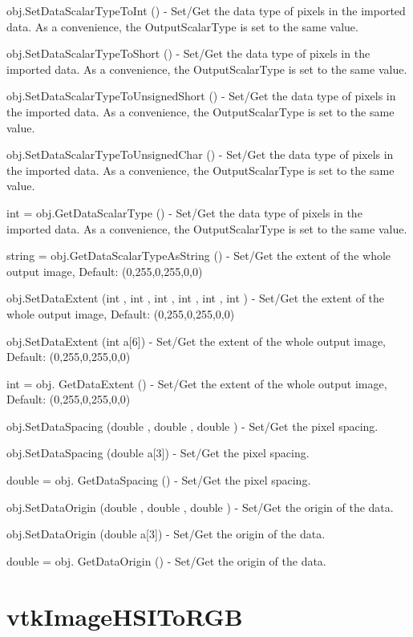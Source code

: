 \begin{DoxyItemize}
\item {\ttfamily obj.\-Set\-Data\-Scalar\-Type\-To\-Int ()} -\/ Set/\-Get the data type of pixels in the imported data. As a convenience, the Output\-Scalar\-Type is set to the same value.  
\item {\ttfamily obj.\-Set\-Data\-Scalar\-Type\-To\-Short ()} -\/ Set/\-Get the data type of pixels in the imported data. As a convenience, the Output\-Scalar\-Type is set to the same value.  
\item {\ttfamily obj.\-Set\-Data\-Scalar\-Type\-To\-Unsigned\-Short ()} -\/ Set/\-Get the data type of pixels in the imported data. As a convenience, the Output\-Scalar\-Type is set to the same value.  
\item {\ttfamily obj.\-Set\-Data\-Scalar\-Type\-To\-Unsigned\-Char ()} -\/ Set/\-Get the data type of pixels in the imported data. As a convenience, the Output\-Scalar\-Type is set to the same value.  
\item {\ttfamily int = obj.\-Get\-Data\-Scalar\-Type ()} -\/ Set/\-Get the data type of pixels in the imported data. As a convenience, the Output\-Scalar\-Type is set to the same value.  
\item {\ttfamily string = obj.\-Get\-Data\-Scalar\-Type\-As\-String ()} -\/ Set/\-Get the extent of the whole output image, Default\-: (0,255,0,255,0,0)  
\item {\ttfamily obj.\-Set\-Data\-Extent (int , int , int , int , int , int )} -\/ Set/\-Get the extent of the whole output image, Default\-: (0,255,0,255,0,0)  
\item {\ttfamily obj.\-Set\-Data\-Extent (int a\mbox{[}6\mbox{]})} -\/ Set/\-Get the extent of the whole output image, Default\-: (0,255,0,255,0,0)  
\item {\ttfamily int = obj. Get\-Data\-Extent ()} -\/ Set/\-Get the extent of the whole output image, Default\-: (0,255,0,255,0,0)  
\item {\ttfamily obj.\-Set\-Data\-Spacing (double , double , double )} -\/ Set/\-Get the pixel spacing.  
\item {\ttfamily obj.\-Set\-Data\-Spacing (double a\mbox{[}3\mbox{]})} -\/ Set/\-Get the pixel spacing.  
\item {\ttfamily double = obj. Get\-Data\-Spacing ()} -\/ Set/\-Get the pixel spacing.  
\item {\ttfamily obj.\-Set\-Data\-Origin (double , double , double )} -\/ Set/\-Get the origin of the data.  
\item {\ttfamily obj.\-Set\-Data\-Origin (double a\mbox{[}3\mbox{]})} -\/ Set/\-Get the origin of the data.  
\item {\ttfamily double = obj. Get\-Data\-Origin ()} -\/ Set/\-Get the origin of the data.  
\end{DoxyItemize}\hypertarget{vtkimaging_vtkimagehsitorgb}{}\section{vtk\-Image\-H\-S\-I\-To\-R\-G\-B}\label{vtkimaging_vtkimagehsitorgb}

